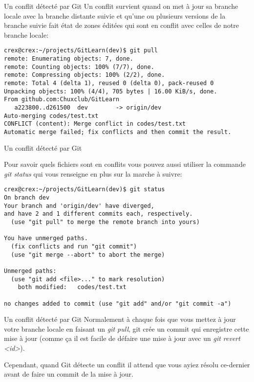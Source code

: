 \documentclass{beamer}
\begin{document}
\begin{frame}[fragile]{Un conflit détecté par Git}
Un conflit survient quand on met à jour sa branche locale avec la branche distante suivie et qu'une ou plusieurs versions de la branche suivie fait état de zones éditées qui sont en conflit avec celles de notre branche locale:
\begin{mdframed}[style=Bash]
\begin{lstlisting}[style=Bash, caption={Exemple de détection automatique de conflit d'édition}]
crex@crex:~/projects/GitLearn(dev)$ git pull
remote: Enumerating objects: 7, done.
remote: Counting objects: 100% (7/7), done.
remote: Compressing objects: 100% (2/2), done.
remote: Total 4 (delta 1), reused 0 (delta 0), pack-reused 0
Unpacking objects: 100% (4/4), 705 bytes | 16.00 KiB/s, done.
From github.com:Chuxclub/GitLearn
   a223800..d261500  dev        -> origin/dev
Auto-merging codes/test.txt
CONFLICT (content): Merge conflict in codes/test.txt
Automatic merge failed; fix conflicts and then commit the result.
\end{lstlisting}
\end{mdframed}
\end{frame}

\begin{frame}[fragile]{Un conflit détecté par Git}

Pour savoir quels fichiers sont en conflits vous pouvez aussi utiliser la commande \textit{git status} qui vous renseigne en plus sur la marche à suivre:
\begin{mdframed}[style=Bash]
\begin{lstlisting}[style=Bash, caption=Les fichiers en conflit indiqués par git status]
crex@crex:~/projects/GitLearn(dev)$ git status
On branch dev
Your branch and 'origin/dev' have diverged,
and have 2 and 1 different commits each, respectively.
  (use "git pull" to merge the remote branch into yours)

You have unmerged paths.
  (fix conflicts and run "git commit")
  (use "git merge --abort" to abort the merge)

Unmerged paths:
  (use "git add <file>..." to mark resolution)
	both modified:   codes/test.txt

no changes added to commit (use "git add" and/or "git commit -a")
\end{lstlisting}
\end{mdframed}
\end{frame}

\begin{frame}{Un conflit détecté par Git}
Normalement à chaque fois que vous mettez à jour votre branche locale en faisant un \textit{git pull}, git crée un commit qui enregistre cette mise à jour (comme ça il est facile de défaire une mise à jour avec un \textit{git revert <id>}).\\
\medskip

Cependant, quand Git détecte un conflit il attend que vous ayiez résolu ce-dernier avant de faire un commit de la mise à jour.
\end{frame}
\end{document}
